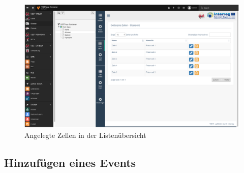 \begin{figure}[ht!]
\centering
\includegraphics[width=12cm]{Figures/paula/glossar/angelegte_zellen.png}
\caption{Angelegte Zellen in der Listenübersicht}
\label{img:angelegte_zellen}
\end{figure}

\subsection{Hinzufügen eines Events}

